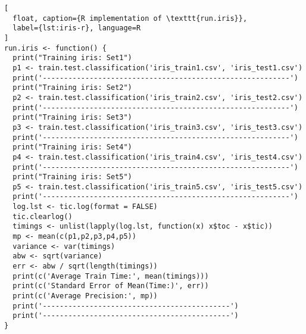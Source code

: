 \begin{lstlisting}[
  float, caption={R implementation of \texttt{run.iris}},
  label={lst:iris-r}, language=R
]
run.iris <- function() {
  print("Training iris: Set1")
  p1 <- train.test.classification('iris_train1.csv', 'iris_test1.csv')
  print('----------------------------------------------------------')
  print("Training iris: Set2")
  p2 <- train.test.classification('iris_train2.csv', 'iris_test2.csv')
  print('----------------------------------------------------------')
  print("Training iris: Set3")
  p3 <- train.test.classification('iris_train3.csv', 'iris_test3.csv')
  print('----------------------------------------------------------')
  print("Training iris: Set4")
  p4 <- train.test.classification('iris_train4.csv', 'iris_test4.csv')
  print('----------------------------------------------------------')
  print("Training iris: Set5")
  p5 <- train.test.classification('iris_train5.csv', 'iris_test5.csv')
  print('----------------------------------------------------------')
  log.lst <- tic.log(format = FALSE)
  tic.clearlog()
  timings <- unlist(lapply(log.lst, function(x) x$toc - x$tic))
  mp <- mean(c(p1,p2,p3,p4,p5))
  variance <- var(timings)
  abw <- sqrt(variance)
  err <- abw / sqrt(length(timings))
  print(c('Average Train Time:', mean(timings)))
  print(c('Standard Error of Mean(Time:)', err))
  print(c('Average Precision:', mp))
  print('--------------------------------------------')
  print('--------------------------------------------')
}
\end{lstlisting}
